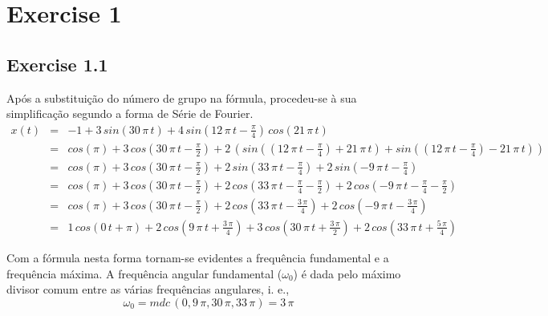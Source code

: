 \documentclass[a4paper]{article}
\title{\documentTitle}
\author{\documentAuthors}
\begin{document}
\maketitle
\cleardoublepage

\tableofcontents
\cleardoublepage

\setlength{\parindent}{1cm}
\setlength{\parskip}{0.3cm}

\section{Exercise 1}
\subsection{Exercise 1.1}
\label{subsec:ex_1_1}
\noindent Após a substituição do número de grupo na fórmula, procedeu-se à sua simplificação segundo a forma de Série de Fourier.
\begin{eqnarray}
	x(t) & = & -1 + 3 \, sin(30 \, \pi \, t) + 4 \, sin\left( 12 \, \pi \, t - \frac{\pi}{4} \right) \, cos(21 \, \pi \, t) \\
	& = & cos(\pi) + 3 \, cos\left( 30 \, \pi \, t - \frac{\pi}{2} \right) + 2 \, \left( sin\left( \left( 12 \, \pi \, t - \frac{\pi}{4} \right) + 21 \, \pi \, t \right) + sin\left( \left( 12 \, \pi \, t - \frac{\pi}{4} \right) - 21 \, \pi \, t\right) \right) \\
	& = & cos(\pi) + 3 \, cos\left( 30 \, \pi \, t - \frac{\pi}{2} \right) + 2 \, sin\left( 33 \, \pi \, t - \frac{\pi}{4} \right) + 2 \, sin\left( -9 \, \pi \, t - \frac{\pi}{4} \right) \\
	& = & cos(\pi) + 3 \, cos\left( 30 \, \pi \, t - \frac{\pi}{2} \right) + 2 \, cos\left( 33 \, \pi \, t - \frac{\pi}{4} - \frac{\pi}{2} \right) + 2 \, cos\left( -9 \, \pi \, t - \frac{\pi}{4} - \frac{\pi}{2} \right) \\
	& = & cos(\pi) + 3 \, cos\left( 30 \, \pi \, t - \frac{\pi}{2} \right) + 2 \, cos\left( 33 \, \pi \, t - \frac{3 \, \pi}{4} \right) + 2 \, cos\left( -9 \, \pi \, t - \frac{3 \, \pi}{4} \right) \\
	& = & 1 \, cos(0 \, t + \pi) + 2 \, cos\left( 9 \, \pi \, t + \frac{3 \, \pi}{4} \right) + 3 \, cos\left( 30 \, \pi \, t + \frac{3 \, \pi}{2} \right) + 2 \, cos\left( 33 \, \pi \, t + \frac{5 \, \pi}{4} \right)
\end{eqnarray}

\noindent Com a fórmula nesta forma tornam-se evidentes a frequência fundamental e a frequência máxima. A frequência angular fundamental ($\omega_0$) é dada pelo máximo divisor comum entre as várias frequências angulares, i. e.,
\begin{equation}
	\omega_0 = mdc \, (0, 9 \, \pi, 30 \, \pi, 33 \, \pi) = 3 \, \pi
\end{equation}
\end{document}
